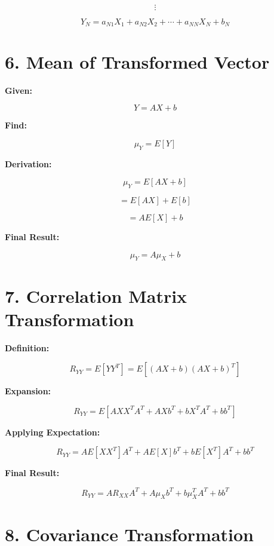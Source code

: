 ﻿\documentclass[12pt]{article}
\begin{document}
\[
\vdots
\]


\[
Y_N = a_{N1}X_1 + a_{N2}X_2 + \cdots + a_{NN}X_N + b_N
\]




\section*{6. Mean of Transformed Vector}


\vspace{0.2cm}


\textbf{Given:}


\[
Y = AX + b
\]


\textbf{Find:}


\[
\mu_Y = E[Y]
\]


\textbf{Derivation:}


\[
\mu_Y = E[AX + b]
\]


\[
= E[AX] + E[b]
\]


\[
= A E[X] + b
\]


\textbf{Final Result:}


\[
\mu_Y = A\mu_X + b
\]




\section*{7. Correlation Matrix Transformation}


\vspace{0.2cm}


\textbf{Definition:}


\[
R_{YY} = E[YY^T] = E[(AX + b)(AX + b)^T]
\]


\textbf{Expansion:}


\[
R_{YY} = E[AXX^TA^T + AXb^T + bX^TA^T + bb^T]
\]


\textbf{Applying Expectation:}


\[
R_{YY} = A E[XX^T] A^T + A E[X] b^T + b E[X^T] A^T + bb^T
\]


\textbf{Final Result:}


\[
R_{YY} = A R_{XX} A^T + A \mu_X b^T + b \mu_X^T A^T + bb^T
\]




\section*{8. Covariance Transformation}
\end{document}
